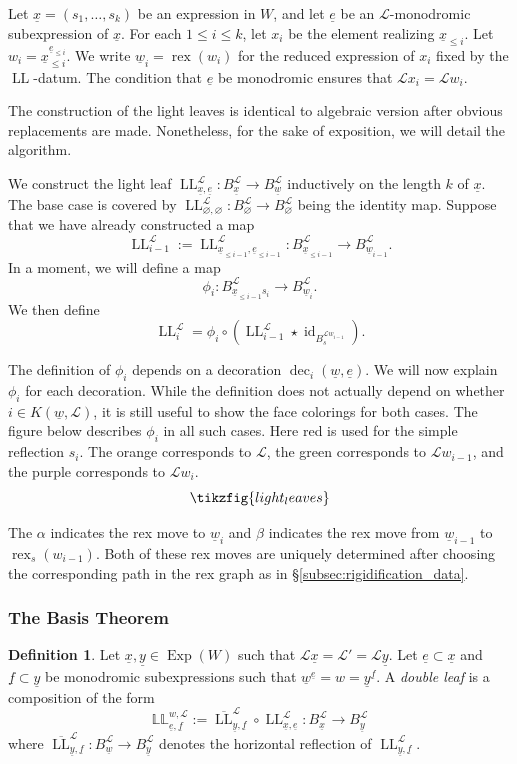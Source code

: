\documentclass{amsart}
\newcommand{\scrL}{\mathcal{L}}
\DeclareMathOperator{\id}{id}
\DeclareMathOperator{\rex}{rex}
\DeclareMathOperator{\LL}{LL}
\newcommand{\dLL}{\mathbb{L}\mathbb{L}}
\DeclareMathOperator{\dec}{dec}
\DeclareMathOperator{\Exp}{Exp}
\newcommand{\ue}{\underline{e}}
\newcommand{\uf}{\underline{f}}
\newcommand{\uw}{\underline{w}}
\newcommand{\ux}{\underline{x}}
\newcommand{\uy}{\underline{y}}
\renewcommand{\emptyset}{\varnothing}
\theoremstyle{definition}
\newtheorem{definition}[subsubsection]{Definition}
\numberwithin{equation}{subsection}
\begin{document}
Let $\ux = (s_1, \ldots, s_k)$ be an expression in $W$, and let $\ue$ be an $\scrL$-monodromic subexpression of $\ux$. For each $1 \leq i \leq k$, let $x_i$ be the element realizing $\ux_{\leq i}$.
Let $w_i = \ux_{\leq i}^{\ue_{\leq i}}$.
We write $\uw_i = \rex (w_i)$ for the reduced expression of $x_i$ fixed by the $\LL$-datum. 
The condition that $\ue$ be monodromic ensures that $\scrL x_i = \scrL w_i$.

The construction of the light leaves is identical to algebraic version after obvious replacements are made. 
Nonetheless, for the sake of exposition, we will detail the algorithm.

We construct the light leaf $\LL_{\ux, \ue}^{\scrL} : B_{\ux}^{\scrL} \to B_{\uw}^{\scrL}$ inductively on the length $k$ of $\ux$.
The base case is covered by $\LL_{\emptyset, \emptyset}^{\scrL} : B_{\emptyset}^{\scrL} \to B_{\emptyset}^{\scrL}$ being the identity map. 
Suppose that we have already constructed a map 
\[\LL_{i-1}^{\scrL} := \LL_{\ux_{\leq i-1}, \ue_{\leq i-1}}^{\scrL} : B_{\ux_{\leq i-1}}^{\scrL} \to B_{\uw_{i-1}}^{\scrL}.\]
In a moment, we will define a map 
\[\phi_i : B_{\ux_{\leq i-1} s_i}^{\scrL} \to B_{\uw_{i}}^{\scrL}.\] 
We then define 
\[\LL_i^{\scrL} = \phi_i \circ ( \LL_{i-1}^{\scrL} \star \id_{B_s^{\scrL w_{i-1}}}).\]

The definition of $\phi_i$ depends on a decoration $\dec_i (\uw, \ue)$.
We will now explain $\phi_i$ for each decoration. While the definition does not actually depend on whether $i \in K (\uw, \scrL)$, it is still useful to show the face colorings for both cases. 
The figure below describes $\phi_i$ in all such cases. Here red is used for the simple reflection $s_i$. The orange corresponds to $\scrL$, the green corresponds to $\scrL w_{i-1}$, and the purple corresponds to $\scrL w_i$. 
\begin{equation*}
    \tikzfig{light_leaves}
\end{equation*}

The $\alpha$ indicates the rex move to $\uw_i$ and $\beta$ indicates the rex move from $\uw_{i-1}$ to $\rex_s (w_{i-1})$. Both of these rex moves are uniquely determined after choosing the corresponding path in the rex graph as in \S \ref{subsec:rigidification_data}.

\subsubsection{The Basis Theorem}

\begin{definition}
    Let $\ux, \uy \in \Exp (W)$ such that $\scrL \ux = \scrL' = \scrL \uy$. Let $\ue \subset \ux$ and $\uf \subset \uy$ be monodromic subexpressions such that $\uw^{\ue} = w = \uy^{\uf}$.
    A \emph{double leaf} is a composition of the form
    \[ \dLL_{\ue, \uf}^{w, \scrL} := \overline{\LL}_{\uy, \uf}^{\scrL} \circ \LL_{\ux, \ue}^{\scrL} : B_{\ux}^{\scrL} \to B_{\uy}^{\scrL}\]
    where $\overline{\LL}_{\uy, \uf}^{\scrL} : B_{\uw}^{\scrL} \to B_{\uy}^{\scrL}$ denotes the horizontal reflection of $\LL_{\uy, \uf}^{\scrL}$.
\end{definition}
\end{document}
